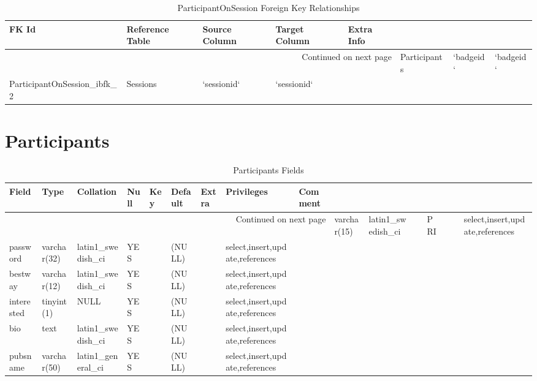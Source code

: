 \documentclass[tablesignature,landscape]{scrartcl}
\begin{document}
\begin{longtable}{|l|l|l|l|l|}
\caption{ParticipantOnSession Foreign Key Relationships} \label{tbl:participantonsessionfkr}\\
\hline
 FK Id                              &  Reference Table  &  Source Column  &  Target Column  &  Extra Info \\
\hline
\endhead
\hline\multicolumn{5}{r}{Continued on next page}\
\endfoot
\endlastfoot
\hline
 ParticipantOnSession\_{}ibfk\_{}1  &  Participants     &  `badgeid`      &  `badgeid`      &              \\
 ParticipantOnSession\_{}ibfk\_{}2  &  Sessions         &  `sessionid`    &  `sessionid`    &              \\
\hline
\end{longtable}
\section{Participants}
\label{sec-10}


\begin{longtable}{|l|l|l|l|l|l|l|l|l|}
\caption{Participants Fields} \label{tbl:participantsfields}\\
\hline
 Field       &  Type         &  Collation                &  Null  &  Key  &  Default  &  Extra  &  Privileges                       &  Comment \\
\hline
\endhead
\hline\multicolumn{9}{r}{Continued on next page}\
\endfoot
\endlastfoot
\hline
 badgeid     &  varchar(15)  &  latin1\_{}swedish\_{}ci  &        &  PRI  &           &         &  select,insert,update,references  &           \\
 password    &  varchar(32)  &  latin1\_{}swedish\_{}ci  &  YES   &       &  (NULL)   &         &  select,insert,update,references  &           \\
 bestway     &  varchar(12)  &  latin1\_{}swedish\_{}ci  &  YES   &       &  (NULL)   &         &  select,insert,update,references  &           \\
 interested  &  tinyint(1)   &  NULL                     &  YES   &       &  (NULL)   &         &  select,insert,update,references  &           \\
 bio         &  text         &  latin1\_{}swedish\_{}ci  &  YES   &       &  (NULL)   &         &  select,insert,update,references  &           \\
 pubsname    &  varchar(50)  &  latin1\_{}general\_{}ci  &  YES   &       &  (NULL)   &         &  select,insert,update,references  &           \\
\hline
\end{longtable}
\end{document}
